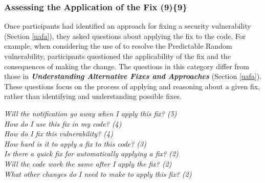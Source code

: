 \documentclass{acm_proc_article-sp}
\begin{document}



\subsubsection{\textbf{Assessing the Application of the Fix (9)\{9\}}}\label{aaf}
Once participants had identified an approach for fixing a security vulnerability (Section \ref{uafa}), they asked questions about applying the fix to the code.
For example, when considering the use of  to resolve the Predictable Random vulnerability, participants questioned the applicability of the fix and the consequences of making the change. 
The questions in this category differ from those in \emph{\textbf{Understanding Alternative Fixes and Approaches}} (Section \ref{uafa}). 
These questions focus on the process of applying  and reasoning about a given fix, rather than identifying and understanding possible fixes.


\noindent\emph{Will the notification go away when I apply this fix? (5)} \\
\emph{How do I use this fix in my code? (4)} \\
\emph{How do I fix this vulnerability? (4)} \\
\emph{How hard is it to apply a fix to this code? (3)} \\
\emph{Is there a quick fix for automatically applying a fix? (2)} \\
\emph{Will the code work the same after I apply the fix? (2)} \\
\emph{What other changes do I need to make to apply this fix? (2)} 
\end{document}
